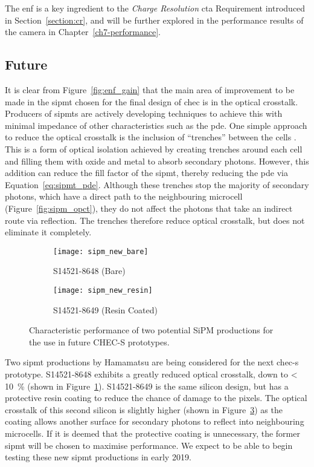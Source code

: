 The \gls{enf} is a key ingredient to the \textit{Charge Resolution} \gls{cta} Requirement introduced in Section~\ref{section:cr}, and will be further explored in the performance results of the camera in Chapter~\ref{ch7-performance}.

\subsection{Future} \label{section:sipmt_future}

It is clear from Figure~\ref{fig:enf_gain} that the main area of improvement to be made in the \gls{sipmt} chosen for the final design of \gls{chec} is in the optical crosstalk. Producers of \glspl{sipmt} are actively developing techniques to achieve this with minimal impedance of other characteristics such as the \gls{pde}. One simple approach to reduce the optical crosstalk is the inclusion of ``trenches'' between the cells \cite{Kindt1998,Pagano2011}. This is a form of optical isolation achieved by creating trenches around each cell and filling them with oxide and metal to absorb secondary photons. However, this addition can reduce the fill factor of the \gls{sipmt}, thereby reducing the \gls{pde} via Equation~\ref{eq:sipmt_pde}. Although these trenches stop the majority of secondary photons, which have a direct path to the neighbouring microcell (Figure~\ref{fig:sipm_opct}), they do not affect the photons that take an indirect route via reflection. The trenches therefore reduce optical crosstalk, but does not eliminate it completely.

\begin{figure}
  \begin{subfigure}[b]{0.49\textwidth}
    \texttt{[image: sipm\_new\_bare]}
    \caption{S14521-8648 (Bare) \cite{Hamamatsu2018a}}
    \label{fig:sipm_new_bare}
  \end{subfigure}
  \hfill
  \begin{subfigure}[b]{0.49\textwidth}
    \texttt{[image: sipm\_new\_resin]}
    \caption{S14521-8649 (Resin Coated) \cite{Hamamatsu2018b}}
    \label{fig:sipm_new_resin}
  \end{subfigure}
  \caption[Characteristic performance of future CHEC-S SiPMs.]{Characteristic performance of two potential SiPM productions for the use in future CHEC-S prototypes.}
\end{figure}

Two \gls{sipmt} productions by Hamamatsu are being considered for the next \gls{chec-s} prototype. S14521-8648 exhibits a greatly reduced optical crosstalk, down to \SI{< 10}{\percent} (shown in Figure~\ref{fig:sipm_new_bare}). S14521-8649 is the same silicon design, but has a protective resin coating to reduce the chance of damage to the pixels. The optical crosstalk of this second silicon is slightly higher (shown in Figure~\ref{fig:sipm_new_resin}) as the coating allows another surface for secondary photons to reflect into neighbouring microcells. If it is deemed that the protective coating is unnecessary, the former \gls{sipmt} will be chosen to maximise performance. We expect to be able to begin testing these new \gls{sipmt} productions in early 2019.

